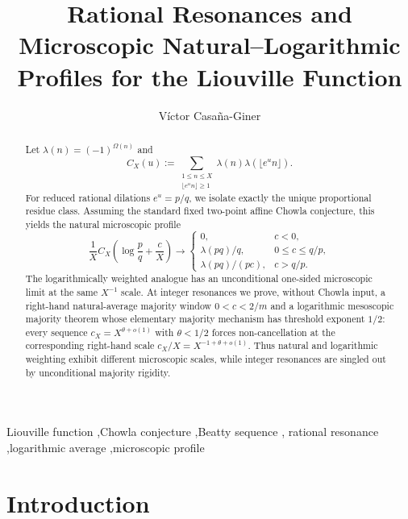 \documentclass[preprint,12pt]{elsarticle}
\numberwithin{equation}{section}
\theoremstyle{plain}
\theoremstyle{definition}
\theoremstyle{remark}
\begin{document}
\begin{frontmatter}

\title{Rational Resonances and Microscopic Natural--Logarithmic Profiles for the Liouville Function}

\author[uned]{Víctor Casaña-Giner\texorpdfstring{}{}}

\begin{abstract}
Let $\lambda(n)=(-1)^{\Omega(n)}$ and
\[
C_X(u):=\sum_{\substack{1\le n\le X\\ \lfloor e^u n\rfloor\ge1}}
\lambda(n)\lambda(\lfloor e^u n\rfloor).
\]
For reduced rational dilations $e^u=p/q$, we isolate exactly the unique
proportional residue class. Assuming the standard fixed two-point affine
Chowla conjecture, this yields the natural microscopic profile
\[
\frac{1}{X}C_X\!\left(\log\frac pq+\frac cX\right)
\longrightarrow
\begin{cases}
0,&c<0,\\
\lambda(pq)/q,&0\le c\le q/p,\\
\lambda(pq)/(pc),&c>q/p.
\end{cases}
\]
The logarithmically weighted analogue has an unconditional one-sided
microscopic limit at the same $X^{-1}$ scale. At integer resonances we prove,
without Chowla input, a right-hand natural-average majority window
$0<c<2/m$ and a logarithmic mesoscopic majority theorem whose elementary
majority mechanism has threshold exponent $1/2$: every sequence
$c_X=X^{\theta+o(1)}$ with $\theta<1/2$ forces non-cancellation at the
corresponding right-hand scale $c_X/X=X^{-1+\theta+o(1)}$. Thus natural and logarithmic weighting exhibit different
microscopic scales, while integer resonances are singled out by unconditional
majority rigidity.
\end{abstract}

\begin{keyword}
Liouville function \sep Chowla conjecture \sep Beatty sequence \sep
rational resonance \sep logarithmic average \sep microscopic profile
\end{keyword}

\end{frontmatter}

\section{Introduction}
\label{sec:introduction}
\end{document}
